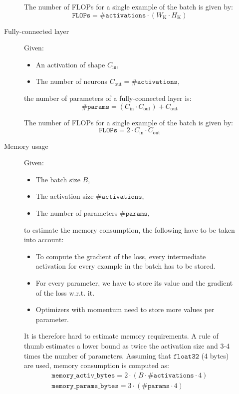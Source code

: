 \begin{description}
\begin{description}
                The number of FLOPs for a single example of the batch is given by:
                \[ \texttt{FLOPs} = \texttt{\#activations} \cdot (W_\text{K} \cdot H_\text{K}) \]

            \item[Fully-connected layer]
                Given:
                \begin{itemize}
                    \item An activation of shape $C_\text{in}$,
                    \item The number of neurons $C_\text{out} = \texttt{\#activations}$,
                \end{itemize}
                the number of parameters of a fully-connected layer is:
                \[ \texttt{\#params} = (C_\text{in} \cdot C_\text{out}) + C_\text{out}\]

                The number of FLOPs for a single example of the batch is given by:
                \[ \texttt{FLOPs} = 2 \cdot C_\text{in} \cdot C_\text{out} \]

            \item[Memory usage]
                Given:
                \begin{itemize}
                    \item The batch size $B$, 
                    \item The activation size $\texttt{\#activations}$, 
                    \item The number of parameters $\texttt{\#params}$, 
                \end{itemize}
                to estimate the memory consumption, the following have to be taken into account:
                \begin{itemize}
                    \item To compute the gradient of the loss, every intermediate activation for every example in the batch has to be stored.
                    \item For every parameter, we have to store its value and the gradient of the loss w.r.t. it.
                    \item Optimizers with momentum need to store more values per parameter.
                \end{itemize}

                It is therefore hard to estimate memory requirements. 
                A rule of thumb estimates a lower bound as twice the activation size and 3-4 times the number of parameters.
                Assuming that $\texttt{float32}$ (4 bytes) are used, memory consumption is computed as:
                \[
                    \begin{gathered}
                        \texttt{memory\_activ\_bytes} = 2 \cdot (B \cdot \texttt{\#activations} \cdot 4) \\
                        \texttt{memory\_params\_bytes} = 3 \cdot (\texttt{\#params} \cdot 4)
                    \end{gathered}  
                \]
        \end{description}
\end{description}


